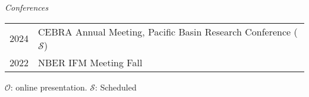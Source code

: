 \documentclass[10pt]{article}
\begin{document}
\noindent \emph{Conferences}\\[0.1in]
\begin{tabular}{@{}p{1.8cm}p{13cm}}
2024 & CEBRA Annual Meeting, Pacific Basin Research Conference ($\mathcal{S}$)\\
2022& NBER IFM Meeting Fall
\end{tabular}


{\footnotesize $\mathcal{O}$: online presentation. $\mathcal{S}$: Scheduled}









%
%
%

\end{document}
